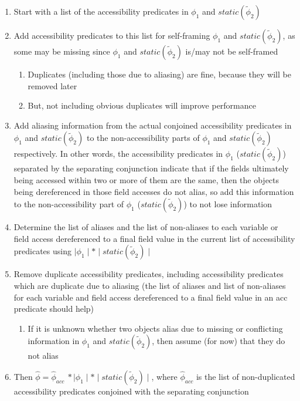 \documentclass {article}
\newcommand{\fphi}{\widehat{\phi}}
\newcommand{\tphi}{\widetilde{\phi}}
\begin{document}
\begin{enumerate}
\item Start with a list of the accessibility predicates in $\phi_1$ and $static(\tphi_2)$
\item Add accessibility predicates to this list for self-framing $\phi_1$ and $static(\tphi_2)$, as some may be missing since $\phi_1$ and $static(\tphi_2)$ is/may not be self-framed
	\begin{enumerate}
	\item Duplicates (including those due to aliasing) are fine, because they will be removed later
	\item But, not including obvious duplicates will improve performance
	\end{enumerate}
\item Add aliasing information from the actual conjoined accessibility predicates in $\phi_1$ and $static(\tphi_2)$ to the non-accessibility parts of $\phi_1$ and $static(\tphi_2)$ respectively. In other words, the accessibility predicates in $\phi_1$ ($static(\tphi_2)$) separated by the separating conjunction indicate that if the fields ultimately being accessed within two or more of them are the same, then the objects being dereferenced in those field accesses do not alias, so add this information to the non-accessibility part of $\phi_1$ ($static(\tphi_2)$) to not lose information
\item Determine the list of aliases and the list of non-aliases to each variable or field access dereferenced to a final field value in the current list of accessibility predicates using $\mid \phi_1 \mid \ast \mid static(\tphi_2) \mid$
\item Remove duplicate accessibility predicates, including accessibility predicates which are duplicate due to aliasing (the list of aliases and list of non-aliases for each variable and field access dereferenced to a final field value in an acc predicate should help)
	\begin{enumerate}
	\item If it is unknown whether two objects alias due to missing or conflicting information in $\phi_1$ and $static(\tphi_2)$, then assume (for now) that they do not alias
	\end{enumerate}
\item Then $\fphi = \fphi_{acc} \ \ast \mid \phi_1 \mid \ast \mid static(\tphi_2) \mid$, where $\fphi_{acc}$ is the list of non-duplicated accessibility predicates conjoined with the separating conjunction
\end{enumerate}
\end{document}

